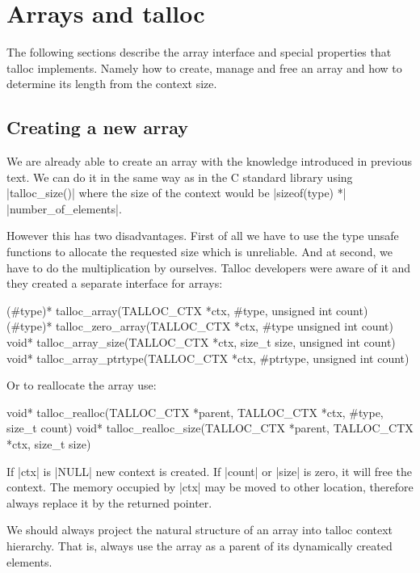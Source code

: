 \section{Arrays and talloc}
\label{talloc:sec:arrays}

The following sections describe the array interface and special properties that
talloc implements. Namely how to create, manage and free an array and how to
determine its length from the context size.

\subsection{Creating a new array}

We are already able to create an array with the knowledge introduced in
previous text. We can do it in the same way as in the C standard library using
|talloc_size()| where the size of the context would be |sizeof(type) *|
|number_of_elements|.

However this has two disadvantages. First of all we have to use the type unsafe
functions to allocate the requested size which is unreliable. And at second,
we have to do the multiplication by ourselves. Talloc developers were aware of
it and they created a separate interface for arrays:

\begin{funcproto}
(#type)* talloc_array(TALLOC_CTX *ctx, #type,
                      unsigned int count)
(#type)* talloc_zero_array(TALLOC_CTX *ctx, #type
                           unsigned int count)
void* talloc_array_size(TALLOC_CTX *ctx, size_t size,
                        unsigned int count)
void* talloc_array_ptrtype(TALLOC_CTX *ctx, #ptrtype,
                           unsigned int count)
\end{funcproto}
\funclistend
Or to reallocate the array use:

\begin{funcproto}
void* talloc_realloc(TALLOC_CTX *parent,
                     TALLOC_CTX *ctx,
                     #type, size_t count)
void* talloc_realloc_size(TALLOC_CTX *parent,
                          TALLOC_CTX *ctx,
                          size_t size)
\end{funcproto}
\begin{funcdesc}
If |ctx| is |NULL| new context is created. If |count| or |size| is zero, it will
free the context. The memory occupied by |ctx| may be moved to other location,
therefore always replace it by the returned pointer.
\end{funcdesc}
\funclistend
We should always project the natural structure of an array into talloc context
hierarchy. That is, always use the array as a parent of its dynamically created
elements.

